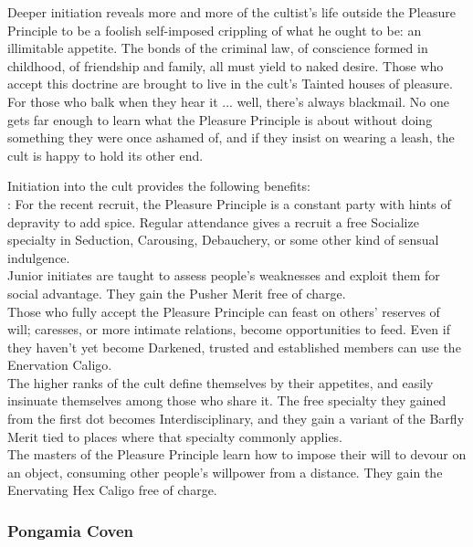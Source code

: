 Deeper initiation reveals more and more of the cultist’s life outside the Pleasure Principle to be a foolish self-imposed crippling of what he ought to be: an illimitable appetite. The bonds of the criminal law, of conscience formed in childhood, of friendship and family, all must yield to naked desire. Those who accept this doctrine are brought to live in the cult’s Tainted houses of pleasure. For those who balk when they hear it ... well, there’s always blackmail. No one gets far enough to learn what the Pleasure Principle is about without doing something they were once ashamed of, and if they insist on wearing a leash, the cult is happy to hold its other end.

Initiation into the cult provides the following benefits: \\

\noindent \textbullet: For the recent recruit, the Pleasure Principle is a constant party with hints of depravity to add spice. Regular attendance gives a recruit a free Socialize specialty in Seduction, Carousing, Debauchery, or some other kind of sensual indulgence.\\
\noindent \textbullet\textbullet Junior initiates are taught to assess people’s weaknesses and exploit them for social advantage. They gain the Pusher Merit free of charge.\\
\noindent \textbullet\textbullet\textbullet Those who fully accept the Pleasure Principle can feast on others’ reserves of will; caresses, or more intimate relations, become opportunities to feed. Even if they haven’t yet become Darkened, trusted and established members can use the Enervation Caligo.\\
\noindent \textbullet\textbullet\textbullet\textbullet The higher ranks of the cult define themselves by their appetites, and easily insinuate themselves among those who share it. The free specialty they gained from the first dot becomes Interdisciplinary, and they gain a variant of the Barfly Merit tied to places where that specialty commonly applies.\\
\noindent \textbullet\textbullet\textbullet\textbullet\textbullet The masters of the Pleasure Principle learn how to impose their will to devour on an object, consuming other people’s willpower from a distance. They gain the Enervating Hex Caligo free of charge.

\subsubsection*{Pongamia Coven}

